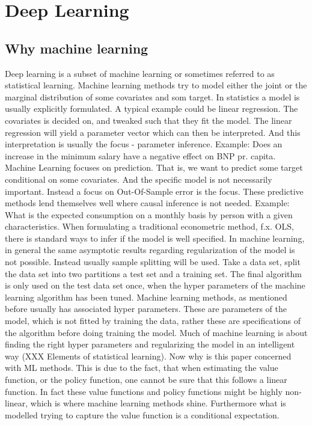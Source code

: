 \section{Deep Learning}
\label{sec:deep_learning}


\subsection{Why machine learning}

Deep learning is a subset of machine learning or sometimes referred to as statistical learning. Machine learning methods try to model either the joint or the marginal distribution of some covariates and som target. In statistics a model is usually explicitly formulated. A typical example could be linear regression. The covariates is decided on, and tweaked such that they fit the model. The linear regression will yield a parameter vector which can then be interpreted. And this interpretation is usually the focus - parameter inference. Example: Does an increase in the minimum salary have a negative effect on BNP pr. capita. Machine Learning focuses on prediction. That is, we want to predict some target conditional on some covariates. And the specific model is not necessarily important. Instead a focus on Out-Of-Sample error is the focus. These predictive methods lend themselves well where causal inference is not needed. Example: What is the expected consumption on a monthly basis by person with a given characteristics. When formulating a traditional econometric method, f.x. OLS, there is standard ways to infer if the model is well specified. In machine learning, in general the same asymptotic results regarding regularization of the model is not possible. Instead usually sample splitting will be used. Take a data set, split the data set into two partitions a test set and a training set. The final algorithm is only used on the test data set once, when the hyper parameters of the machine learning algorithm has been tuned. Machine learning methods, as mentioned before usually has associated hyper parameters. These are parameters of the model, which is not fitted by training the data, rather these are specifications of the algorithm before doing training the model. Much of machine learning is about finding the right hyper parameters and regularizing the model in an intelligent way (XXX Elements of statistical learning). Now why is this paper concerned with ML methods. This is due to the fact, that when estimating the value function, or the policy function, one cannot be sure that this follows a linear function. In fact these value functions and policy functions might be highly non-linear, which is where machine learning methods shine. Furthermore what is modelled trying to capture the value function is a conditional expectation.

